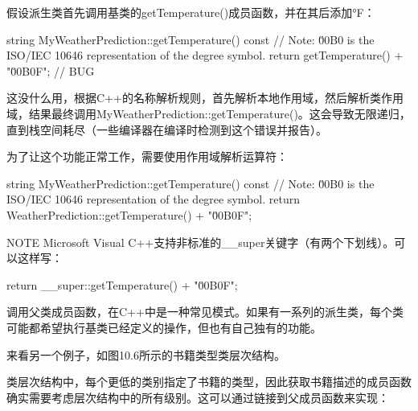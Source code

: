 假设派生类首先调用基类的getTemperature()成员函数，并在其后添加°F：

\begin{cpp}
string MyWeatherPrediction::getTemperature() const
{
    // Note: \u00B0 is the ISO/IEC 10646 representation of the degree symbol.
    return getTemperature() + "\u00B0F"; // BUG
}
\end{cpp}

这没什么用，根据C++的名称解析规则，首先解析本地作用域，然后解析类作用域，结果最终调用MyWeatherPrediction::getTemperature()。这会导致无限递归，直到栈空间耗尽（一些编译器在编译时检测到这个错误并报告）。

为了让这个功能正常工作，需要使用作用域解析运算符：

\begin{cpp}
string MyWeatherPrediction::getTemperature() const
{
    // Note: \u00B0 is the ISO/IEC 10646 representation of the degree symbol.
    return WeatherPrediction::getTemperature() + "\u00B0F";
}
\end{cpp}

\begin{myNotic}{NOTE}
Microsoft Visual C++支持非标准的\_\_super关键字（有两个下划线）。可以这样写：

\begin{cpp}
return __super::getTemperature() + "\u00B0F";
\end{cpp}
\end{myNotic}

调用父类成员函数，在C++中是一种常见模式。如果有一系列的派生类，每个类可能都希望执行基类已经定义的操作，但也有自己独有的功能。

来看另一个例子，如图10.6所示的书籍类型类层次结构。


类层次结构中，每个更低的类别指定了书籍的类型，因此获取书籍描述的成员函数确实需要考虑层次结构中的所有级别。这可以通过链接到父成员函数来实现：

